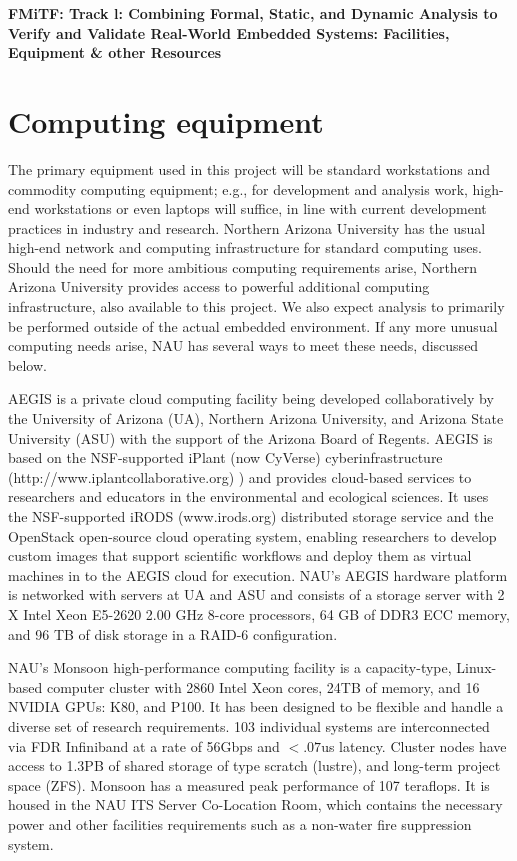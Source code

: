 \documentclass[12pt]{article}
\begin{document}
\begin{center}
{\large\sf\textbf{FMiTF: Track l: Combining Formal, Static, and
  Dynamic Analysis to Verify and Validate Real-World Embedded Systems: Facilities, Equipment \& other Resources}}
\end{center}

\section*{Computing equipment}

The primary equipment used in this project will be standard workstations and commodity computing equipment; e.g., for development and analysis work, high-end workstations or even laptops will suffice, in line with current development practices in industry and research. Northern Arizona University has the usual high-end network and computing infrastructure for standard computing uses.  Should the need for more ambitious computing requirements arise, Northern Arizona University provides access to powerful additional computing infrastructure, also available to this project.  We also expect analysis to primarily be performed outside of the actual embedded environment.  If any more unusual computing needs arise, NAU has several ways to meet these needs, discussed below.

AEGIS is a private cloud computing facility being developed collaboratively by the University of Arizona (UA), Northern Arizona University, and Arizona State University (ASU) with the support of the Arizona Board of Regents. AEGIS is based on the NSF-supported iPlant (now CyVerse) cyberinfrastructure (http://www.iplantcollaborative.org) ) and provides cloud-based services to researchers and educators in the environmental and ecological sciences. It uses the NSF-supported iRODS (www.irods.org) distributed storage service and the OpenStack open-source cloud operating system, enabling researchers to develop custom images that support scientific workflows and deploy them as virtual machines in to the AEGIS cloud for execution. NAU’s AEGIS hardware platform is networked with servers at UA and ASU and consists of a storage server with 2 X Intel Xeon E5-2620 2.00 GHz 8-core processors, 64 GB of DDR3 ECC memory, and 96 TB of disk storage in a RAID-6 configuration.

NAU’s Monsoon high-performance computing facility is a capacity-type, Linux-based computer cluster with 2860 Intel Xeon cores, 24TB of memory, and 16 NVIDIA GPUs: K80, and P100. It has been designed to be flexible and handle a diverse set of research requirements. 103 individual systems are interconnected via FDR Infiniband at a rate of 56Gbps and $<.07$us latency. Cluster nodes have access to 1.3PB of shared storage of type scratch (lustre), and long-term project space (ZFS). Monsoon has a measured peak performance of 107 teraflops. It is housed in the NAU ITS Server Co-Location Room, which contains the necessary power and other facilities requirements such as a non-water fire suppression system.
\end{document}
